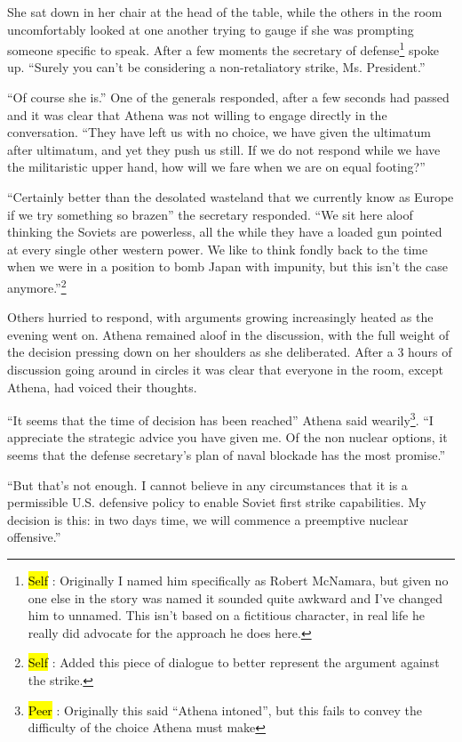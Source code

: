 \documentclass[letterpaper, reqno,11pt]{article}
\newcommand{\hlc}[2][yellow]{{%
    \colorlet{foo}{#1}%
    \sethlcolor{foo}\hl{#2}}%
}
\begin{document}
She sat down in her chair at the head of the table, while the others in the room uncomfortably looked at one another trying to gauge if she was prompting someone specific to speak. After a few moments the secretary of defense\footnote{\hlc[pink]{Self}: Originally I named him specifically as Robert McNamara, but given no one else in the story was named it sounded quite awkward and I've changed him to unnamed. This isn't based on a fictitious character, in real life he really did advocate for the approach he does here.} spoke up. ``Surely you can't be considering a non-retaliatory strike, Ms. President.''

``Of course she is.'' One of the generals responded, after a few seconds had passed and it was clear that Athena was not willing to engage directly in the conversation. ``They have left us with no choice, we have given the ultimatum after ultimatum, and yet they push us still. If we do not respond while we have the militaristic upper hand, how will we fare when we are on equal footing?''

``Certainly better than the desolated wasteland that we currently know as Europe if we try something so brazen'' the secretary responded. ``We sit here aloof thinking the Soviets are powerless, all the while they have a loaded gun pointed at every single other western power. We like to think fondly back to the time when we were in a position to bomb Japan with impunity, but this isn't the case anymore.''\footnote{\hlc[pink]{Self}: Added this piece of dialogue to better represent the argument against the strike.}

Others hurried to respond, with arguments growing increasingly heated as the evening went on. Athena remained aloof in the discussion, with the full weight of the decision pressing down on her shoulders as she deliberated. After a 3 hours of discussion going around in circles it was clear that everyone in the room, except Athena, had voiced their thoughts. 

``It seems that the time of decision has been reached'' Athena said wearily\footnote{\hlc[BurntOrange]{Peer}: Originally this said ``Athena intoned'', but this fails to convey the difficulty of the choice Athena must make}. ``I appreciate the strategic advice you have given me. Of the non nuclear options, it seems that the defense secretary's plan of naval blockade has the most promise.''

``But that's not enough. I cannot believe in any circumstances that it is a permissible U.S. defensive policy to enable Soviet first strike capabilities. My decision is this: in two days time, we will commence a preemptive nuclear offensive.''
\end{document}
